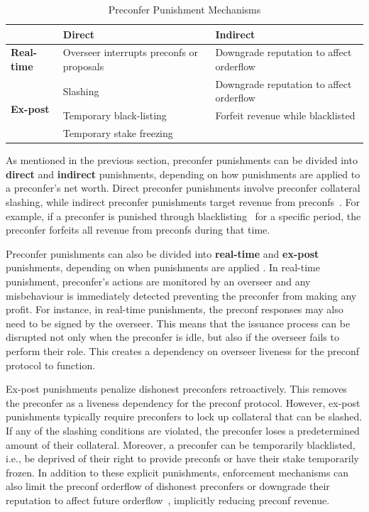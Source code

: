 \documentclass[a4paper]{article}
\theoremstyle{boldstyle}
\begin{document}
    
\begin{table}[h]
    \renewcommand{\arraystretch}{1.5} %
    \centering
    \begin{tabularx}{\textwidth}{| l | X | X |}
        \hline
        & \textbf{Direct} & \textbf{Indirect} \\
        \hline
        \textbf{Real-time} & Overseer interrupts preconfs or proposals & Downgrade reputation to affect orderflow \\
        \hline
        \multirow{3}{*}{\textbf{Ex-post}} 
        & Slashing & Downgrade reputation to affect orderflow \\
        \cline{2-3}
        & Temporary black-listing & Forfeit revenue while blacklisted \\
        \cline{2-3} 
        & Temporary stake freezing & \\
        \hline
    \end{tabularx}
    \caption{Preconfer Punishment Mechanisms}
    \label{tab:punishments}
\end{table}

    
    As mentioned in the previous section, preconfer punishments can be divided into \textbf{direct} and \textbf{indirect} punishments, depending on how punishments are applied to a preconfer's net worth. Direct preconfer punishments involve preconfer collateral slashing, while indirect preconfer punishments target revenue from preconfs~\cite{W:PreconfirmationFairExchange}. For example, if a preconfer is punished through blacklisting~\cite{W:PreconfirmationFairExchange} for a specific period, the preconfer forfeits all revenue from preconfs during that time.
    
    Preconfer punishments can also be divided into \textbf{real-time} and \textbf{ex-post} punishments, depending on when punishments are applied \cite{W:PreconfirmationFairExchange}. In real-time punishment, preconfer's actions are monitored by an overseer and any misbehaviour is immediately detected preventing the preconfer from making any profit. For instance, in real-time punishments, the preconf responses may also need to be signed by the overseer. This means that the issuance process can be disrupted not only when the preconfer is idle, but also if the overseer fails to perform their role. This creates a dependency on overseer liveness for the preconf protocol to function.
    
    Ex-post punishments penalize dishonest preconfers retroactively. This removes the preconfer as a liveness dependency for the preconf protocol. However, ex-post punishments typically require preconfers to lock up collateral that can be slashed. If any of the slashing conditions are violated, the preconfer loses a predetermined amount of their collateral. Moreover, a preconfer can be temporarily blacklisted, i.e., be deprived of their right to provide preconfs or have their stake temporarily frozen. In addition to these explicit punishments, enforcement mechanisms can also limit the preconf orderflow of dishonest preconfers or downgrade their reputation to affect future orderflow~\cite{W:PreconfirmationFairExchange,W:User-DefinedPenalties:EnsuringHonestPreconfBehavior}, implicitly reducing preconf revenue.
\end{document}
